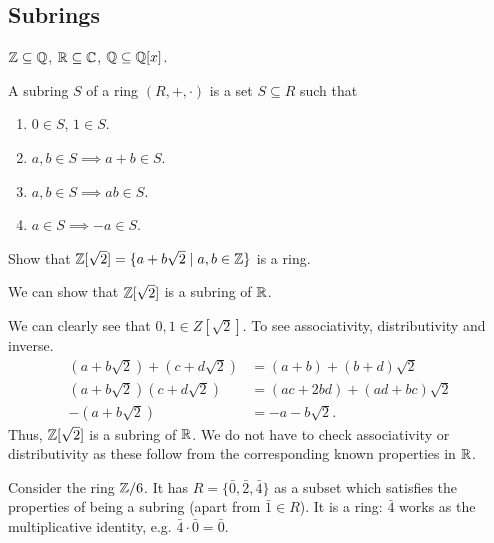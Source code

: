 \documentclass[10pt, a4paper]{article}
\begin{document}
\subsection{Subrings}

\begin{example}
    $\mathbb{Z} \subseteq \mathbb{Q}$,
    $\mathbb{R} \subseteq \mathbb{C}$,
    $\mathbb{Q} \subseteq \mathbb{Q}[x]$.
\end{example}

\begin{definition}[Subring]
    A subring $S$ of a ring $(R, +, \cdot)$ is a set $S \subseteq R$ such that
    
    \begin{enumerate}[label = (\roman*)]
        \item $0 \in S$,
        $1 \in S$.

        \item $a, b \in S \implies a + b \in S$.

        \item $a, b \in S \implies ab \in S$.

        \item $a \in S \implies -a \in S$.
    \end{enumerate}
\end{definition}

\begin{example}
    Show that $\mathbb{Z}[\sqrt{2}] = \{a + b\sqrt{2} \mid a, b \in \mathbb{Z}\}$ is a ring.

    \begin{solution}
        We can show that $\mathbb{Z}[\sqrt{2}]$ is a subring of $\mathbb{R}$.

        We can clearly see that $0, 1 \in Z[\sqrt{2}]$.
        To see associativity, distributivity and inverse.
        \begin{align*}
            (a + b\sqrt{2}) + (c + d\sqrt{2}) &= (a + b) + (b + d)\sqrt{2} \\
            (a + b\sqrt{2})(c + d\sqrt{2}) &= (ac + 2bd) + (ad + bc)\sqrt{2} \\
            -(a + b\sqrt{2}) &= -a - b\sqrt{2}.
        \end{align*}
        Thus,
        $\mathbb{Z}[\sqrt{2}]$ is a subring of $\mathbb{R}$.
        We do not have to check associativity or distributivity as these follow from the corresponding known properties in $\mathbb{R}$.
    \end{solution}
\end{example}

\begin{example}
    Consider the ring $\mathbb{Z} / 6$.
    It has $R = \{\bar{0}, \bar{2}, \bar{4}\}$ as a subset which satisfies the properties of being a subring
    (apart from $\bar{1} \in R$).
    It is a ring:
    $\bar{4}$ works as the multiplicative identity,
    e.g. $\bar{4} \cdot \bar{0} = \bar{0}$.
\end{example}
\end{document}
